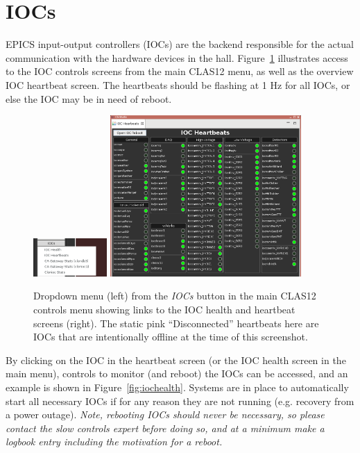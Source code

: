 \documentclass[amsmath,amssymb,notitlepage,11pt]{revtex4}
\begin{document}
\clearpage

\section{IOCs}
EPICS input-output controllers (IOCs) are the backend responsible for the actual communication with the hardware devices in the hall.  Figure~\ref{fig:iocmenu} illustrates access to the IOC controls screens from the main CLAS12 menu, as well as the overview IOC heartbeat screen.  The heartbeats should be flashing at 1 Hz for all IOCs, or else the IOC may be in need of reboot.  

\begin{figure}[htbp]\centering
  \includegraphics[width=0.25\textwidth]{pics/iocmenu}
  \includegraphics[width=0.65\textwidth]{pics/iocbeats}
  \caption{Dropdown menu (left) from the {\em IOCs} button in the main CLAS12 controls menu showing links to the IOC health and heartbeat screens (right).  The static pink ``Disconnected'' heartbeats here are IOCs that are intentionally offline at the time of this screenshot.\label{fig:iocmenu}}
\end{figure}

By clicking on the IOC in the heartbeat screen (or the IOC health screen in the main menu), controls to monitor (and reboot) the IOCs can be accessed, and an example is shown in Figure~\ref{fig:iochealth}.  Systems are in place to automatically start all necessary IOCs if for any reason they are not running (e.g. recovery from a power outage).  {\em Note, rebooting IOCs should never be necessary, so please contact the slow controls expert before doing so, and at a minimum make a logbook entry including the motivation for a reboot.}
\end{document}
